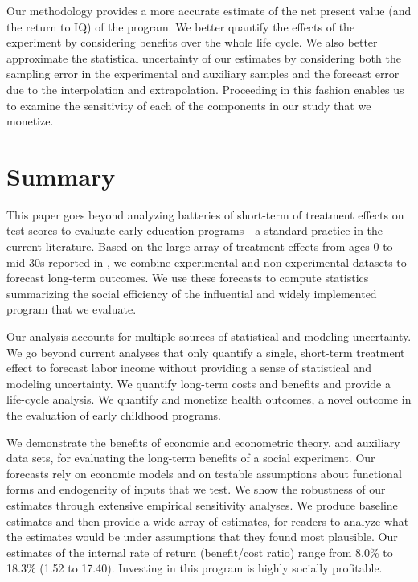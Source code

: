 Our methodology provides a more accurate estimate of the net present value (and the return to IQ) of the program. We better quantify the effects of the experiment by considering benefits over the whole life cycle. We also better approximate the statistical uncertainty of our estimates by considering both the sampling error in the experimental and auxiliary samples and the forecast error due to the interpolation and extrapolation. Proceeding in this fashion enables us to examine the sensitivity of each of the components in our study that we monetize.

\section{Summary} \label{section:conclusion}

This paper goes beyond analyzing batteries of short-term of treatment effects on test scores to evaluate early education programs---a standard practice in the current literature. Based on the large array of treatment effects from ages 0 to mid 30s reported in \citet{Garcia_Heckman_Ziff_2017_Gender-Diff_UNPUBLISHED}, we combine experimental and non-experimental datasets to forecast long-term outcomes. We use these forecasts to compute statistics summarizing the social efficiency of the influential and widely implemented program that we evaluate.

Our analysis accounts for multiple sources of statistical and modeling uncertainty. We go beyond current analyses that only quantify a single, short-term treatment effect to forecast labor income without providing a sense of statistical and modeling uncertainty. We quantify long-term costs and benefits and provide a life-cycle analysis. We quantify and monetize health outcomes, a novel outcome in the evaluation of early childhood programs.

We demonstrate the benefits of economic and econometric theory, and auxiliary data sets, for evaluating the long-term benefits of a social experiment. Our forecasts rely on economic models and on testable assumptions about functional forms and endogeneity of inputs that we test. We show the robustness of our estimates through extensive empirical sensitivity analyses. We produce baseline estimates and then provide a wide array of estimates, for readers to analyze what the estimates would be under assumptions that they found most plausible. Our estimates of the internal rate of return (benefit/cost ratio) range from 8.0\% to 18.3\% (1.52 to 17.40). Investing in this program is highly socially profitable.

